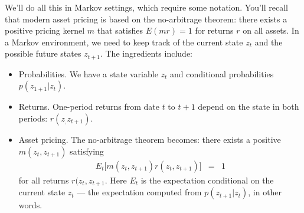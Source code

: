 \documentclass[11pt]{article}
\begin{document}
We'll do all this in Markov settings, which require some notation.
You'll recall that modern asset pricing is based on the no-arbitrage theorem:
there exists a positive pricing kernel $m$ that satisfies
$ E(mr) = 1$ for returns $r$ on all assets.
In a Markov environment, we need to keep track of the current state $z_t$
and the possible future states $z_{t+1}$.
The ingredients include:
%
\begin{itemize}
\item Probabilities.  We have a state variable $z_t$ and conditional probabilities
$ p(z_{1+1} | z_t) $.
\item Returns.  One-period returns from date $t$ to $t+1$ depend
on the state in both periods:  $r(z_,z_{t+1})$.
\item Asset pricing.  The no-arbitrage theorem becomes:  there exists a positive $m(z_t,z_{t+1})$
satisfying
\begin{eqnarray}
    E_t \big[ m(z_t,z_{t+1}) r(z_t,z_{t+1}) \big] &=& 1
    \label{eq:foc} 
\end{eqnarray}
for all returns $ r(z_t,z_{t+1} $.
Here $E_t$ is the expectation conditional on the current state $z_t$
--- the expectation computed from $p(z_{t+1} | z_t)$, in other words.
\end{itemize}
\end{document}
